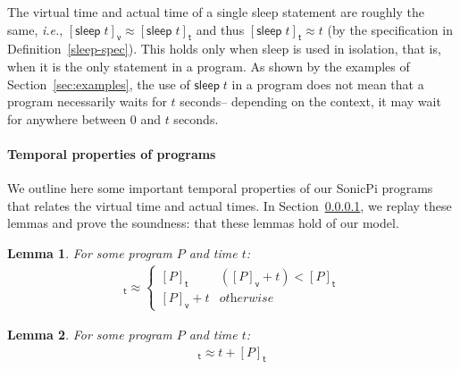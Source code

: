\documentclass[preprint]{sigplanconf}
\renewcommand{\geq}{\geqslant}
\newcommand{\note}[1]{{\color{blue}{#1}}}
\newtheorem{lemma}{Lemma}
\theoremstyle{definition}
\newcommand{\sleep}{\mathsf{sleep}\;}
\newcommand{\sleepOp}{\textsf{sleep}}
\newcommand{\ksleepOp}{\textsf{kernelSleep}}
\newcommand{\lang}{SonicPi}
\newcommand{\vtime}[1]{[#1]_{\mathsf{v}}}
\newcommand{\etime}[1]{[#1]_{\mathsf{t}}}
\newcommand{\ie}{\emph{i.e.}}
\begin{document}
\note{Discuss this further, may be
  able to say later that in some cases $\epsilon$ is the scheduling
  time for play statments?} 


The virtual time and actual time of a single sleep statement 
 are roughly the same, \ie{}, $\vtime{\sleep t} \approx
\etime{\sleep t}$ and thus $\etime{\sleep t} \approx t$ (by the
specification in Definition~\ref{sleep-spec}). This holds
only when \sleepOp{} is used in isolation, that is, when it is the
only statement in a program. As shown by the examples of
Section~\ref{sec:examples}, the use of $\sleep t$ in a program does
not mean that a program necessarily waits for $t$ seconds-- depending
on the context, it may wait for anywhere between $0$ and $t$ seconds.
 
\paragraph{Temporal properties of programs}

We outline here some important temporal properties of our \lang{} programs
that relates the virtual time and actual times. In Section~\ref{}, we
replay these lemmas and prove the soundness: that these lemmas hold of our model.


\begin{lemma}
For some program $P$ and time $t$: 
\begin{align*}
\etime{P; \sleep{} t} \approx
 \begin{cases}
   \etime{P} & (\vtime{P} + t) < \etime{P} \\
   \vtime{P} + t  & \textit{otherwise}
 \end{cases}
\end{align*}
\label{lem:sleep-R}
\end{lemma}

\begin{lemma}
For some program $P$ and time $t$:
\begin{align*}
\etime{\sleep{} t; P} \approx t + \etime{P}
\end{align*}
\label{lem:sleep-L}
\end{lemma}
\end{document}
